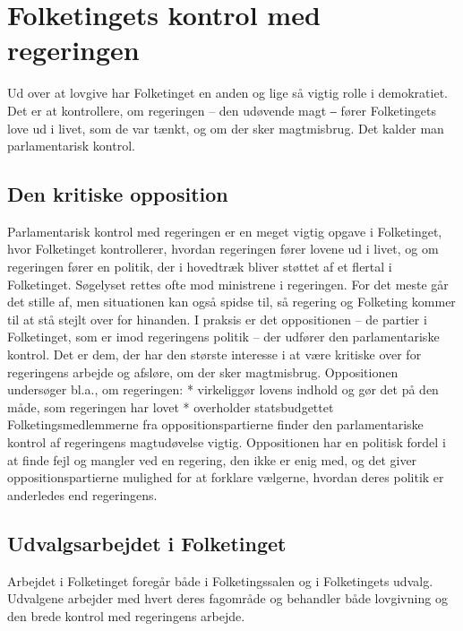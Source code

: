 \documentclass[]{book}
\begin{document}
\hypertarget{folketingets-kontrol-med-regeringen}{%
\section{Folketingets kontrol med regeringen}\label{folketingets-kontrol-med-regeringen}}

Ud over at lovgive har Folketinget en anden og lige så vigtig rolle i demokratiet. Det er at kontrollere, om regeringen -- den udøvende magt ‒ fører Folketingets love ud i livet, som de var tænkt, og om der sker magtmisbrug. Det kalder man parlamentarisk kontrol.

\hypertarget{den-kritiske-opposition}{%
\subsection{Den kritiske opposition}\label{den-kritiske-opposition}}

Parlamentarisk kontrol med regeringen er en meget vigtig opgave i Folketinget, hvor Folketinget kontrollerer, hvordan regeringen fører lovene ud i livet, og om regeringen fører en politik, der i hovedtræk bliver støttet af et flertal i Folketinget.
Søgelyset rettes ofte mod ministrene i regeringen. For det meste går det stille af, men situationen kan også spidse til, så regering og Folketing kommer til at stå stejlt over for hinanden.
I praksis er det oppositionen -- de partier i Folketinget, som er imod regeringens politik -- der udfører den parlamentariske kontrol. Det er dem, der har den største interesse i at være kritiske over for regeringens arbejde og afsløre, om der sker magtmisbrug.
Oppositionen undersøger bl.a., om regeringen:
* virkeliggør lovens indhold og gør det på den måde, som regeringen har lovet
* overholder statsbudgettet\\
Folketingsmedlemmerne fra oppositionspartierne finder den parlamentariske kontrol af regeringens magtudøvelse vigtig. Oppositionen har en politisk fordel i at finde fejl og mangler ved en regering, den ikke er enig med, og det giver oppositionspartierne mulighed for at forklare vælgerne, hvordan deres politik er anderledes end regeringens.

\hypertarget{udvalgsarbejdet-i-folketinget}{%
\subsection{Udvalgsarbejdet i Folketinget}\label{udvalgsarbejdet-i-folketinget}}

Arbejdet i Folketinget foregår både i Folketingssalen og i Folketingets udvalg. Udvalgene arbejder med hvert deres fagområde og behandler både lovgivning og den brede kontrol med regeringens arbejde.
\end{document}
